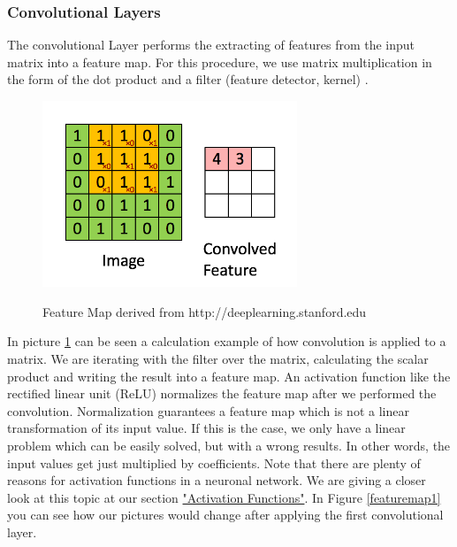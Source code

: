 \documentclass[journal]{IEEEtran}
\begin{document}
\subsubsection{Convolutional Layers}
\noindent The convolutional Layer performs the extracting of features from the input matrix into a feature map. For this procedure, we use matrix multiplication in the form of the dot product and a filter (feature detector, kernel) \cite{Goodfellow-et-al-2016}. 
\begin{figure}
  \begin{center}
  \includegraphics[width=3in]{photo/cnn.png}\\
  \caption{Feature Map derived from http://deeplearning.stanford.edu}
  \label{fig:cnn}
  \end{center}
\end{figure}
In picture \ref{fig:cnn} can be seen a calculation example of how convolution is applied to a matrix. We are iterating with the filter over the matrix, calculating the scalar product and writing the result into a feature map. An activation function like the rectified linear unit (ReLU) normalizes the feature map after we performed the convolution. Normalization guarantees a feature map which is not a linear transformation of its input value. If this is the case, we only have a linear problem which can be easily solved, but with a wrong results. In other words, the input values get just multiplied by coefficients. Note that there are plenty of reasons for activation functions in a neuronal network. We are giving a closer look at this topic at our section \hyperref[sec:activationFunctions]{"Activation Functions"}. In Figure \ref{featuremap1} you can see how our pictures would change after applying the first convolutional layer. \\
\end{document}

